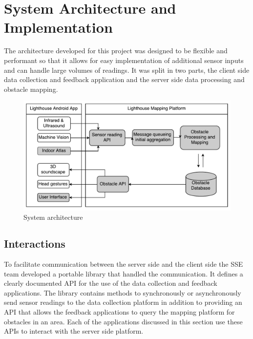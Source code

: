 \documentclass[prodmode,acmtosem]{acmsmall} %
\begin{document}
\section{System Architecture and Implementation}
\label{sec:architecture}
The architecture developed for this project was designed to be flexible and performant so that it allows for easy implementation of additional sensor inputs and can handle large volumes of readings. It was split in two parts, the client side data collection and feedback application and the server side data processing and obstacle mapping.

\begin{figure}[!ht]
\label{fig:architecture}
\centering
\includegraphics[width=\textwidth]{ReportDiagram.pdf}
\caption{System architecture}
\end{figure}

\subsection{Interactions}
\label{sec:interactions}
To facilitate communication between the server side and the client side the SSE team developed a portable library that handled the communication. It defines a clearly documented API for the use of the data collection and feedback applications. The library contains methods to synchronously or asynchronously send sensor readings to the data collection platform in addition to providing an API that allows the feedback applications to query the mapping platform for obstacles in an area. Each of the applications discussed in this section use these APIs to interact with the server side platform.
\end{document}
